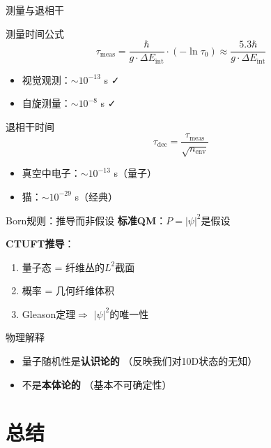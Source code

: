 \documentclass[aspectratio=169]{beamer}
\begin{document}
\begin{frame}{测量与退相干}
\begin{block}{测量时间公式}
\[
\tau_{\text{meas}} = \frac{\hbar}{g \cdot \Delta E_{\text{int}}} \cdot (-\ln \tau_0) \approx \frac{5.3\hbar}{g \cdot \Delta E_{\text{int}}}
\]
\begin{itemize}
    \item 视觉观测：$\sim 10^{-13}$ s ✓
    \item 自旋测量：$\sim 10^{-8}$ s ✓
\end{itemize}
\end{block}

\begin{block}{退相干时间}
\[
\tau_{\text{dec}} = \frac{\tau_{\text{meas}}}{\sqrt{n_{\text{env}}}}
\]
\begin{itemize}
    \item 真空中电子：$\sim 10^{-13}$ s（量子）
    \item 猫：$\sim 10^{-29}$ s（经典）
\end{itemize}
\end{block}
\end{frame}

\begin{frame}{Born规则：推导而非假设}
\textbf{标准QM}：$P = |\psi|^2$是假设

\vspace{0.5cm}

\textbf{CTUFT推导}：
\begin{enumerate}
    \item 量子态 = 纤维丛的$L^2$截面
    \item 概率 = 几何纤维体积
    \item Gleason定理$\Rightarrow$ $|\psi|^2$的唯一性
\end{enumerate}

\vspace{0.5cm}

\begin{alertblock}{物理解释}
\begin{itemize}
    \item 量子随机性是\textbf{认识论的}
    （反映我们对10D状态的无知）
    \item 不是\textbf{本体论的}
    （基本不可确定性）
\end{itemize}
\end{alertblock}
\end{frame}

\section{总结}
\end{document}
